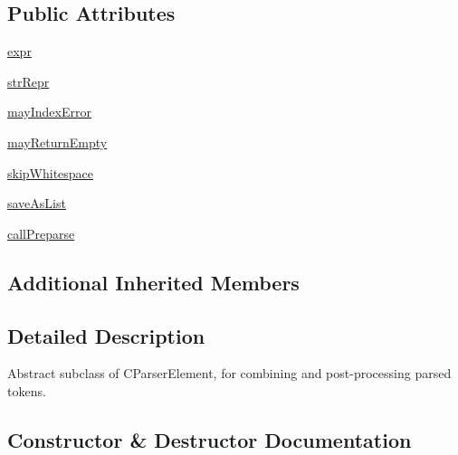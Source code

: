 \subsection*{Public Attributes}
\begin{DoxyCompactItemize}
\item 
\hyperlink{classsetuptools_1_1__vendor_1_1pyparsing_1_1ParseElementEnhance_a445450bd765a74cc1d1567e40cade40d}{expr}
\item 
\hyperlink{classsetuptools_1_1__vendor_1_1pyparsing_1_1ParseElementEnhance_a431f023ff77da06e428cde8a0fd5da1f}{str\+Repr}
\item 
\hyperlink{classsetuptools_1_1__vendor_1_1pyparsing_1_1ParseElementEnhance_a5ef1f0636e3e7a3f96a69e75c910c3c9}{may\+Index\+Error}
\item 
\hyperlink{classsetuptools_1_1__vendor_1_1pyparsing_1_1ParseElementEnhance_a72c1634dc350a267b784bfe0e3d2c360}{may\+Return\+Empty}
\item 
\hyperlink{classsetuptools_1_1__vendor_1_1pyparsing_1_1ParseElementEnhance_a14565d0df531919a66c93eac7ee56fdb}{skip\+Whitespace}
\item 
\hyperlink{classsetuptools_1_1__vendor_1_1pyparsing_1_1ParseElementEnhance_a4660708517eedc2f6f0e90710f38e8fd}{save\+As\+List}
\item 
\hyperlink{classsetuptools_1_1__vendor_1_1pyparsing_1_1ParseElementEnhance_a2ede6069cc5569cac3c97c7161d196cc}{call\+Preparse}
\end{DoxyCompactItemize}
\subsection*{Additional Inherited Members}


\subsection{Detailed Description}
\begin{DoxyVerb}Abstract subclass of C{ParserElement}, for combining and post-processing parsed tokens.
\end{DoxyVerb}
 

\subsection{Constructor \& Destructor Documentation}
\mbox{\label{classsetuptools_1_1__vendor_1_1pyparsing_1_1ParseElementEnhance_ae3f786d98e549890d0d9d625abd8fbe6}} 
